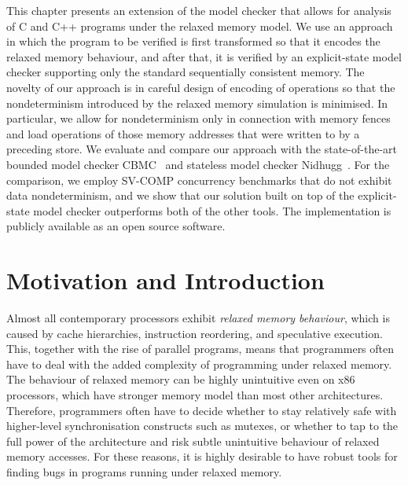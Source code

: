 
\bigskip\noindent
This chapter presents an extension of the \divine model checker that allows for
analysis of C and C++ programs under the \xtso relaxed memory model.
We use an approach in which the program to be verified is first transformed so
that it encodes the relaxed memory behaviour, and after that, it is
verified by an explicit-state model checker supporting only the standard
sequentially consistent memory.
The novelty of our approach is in careful design of encoding of \xtso
operations so that the nondeterminism introduced by the relaxed memory
simulation is minimised.
In particular, we allow for nondeterminism only in connection with memory
fences and load operations of those memory addresses that were written to by a
preceding store.
We evaluate and compare our approach with the state-of-the-art bounded model
checker CBMC~ and stateless model checker Nidhugg~.
For the comparison, we employ SV-COMP concurrency benchmarks that do not exhibit
data nondeterminism, and we show that our solution built on top of the
explicit-state model checker outperforms both of the other tools.
The implementation is publicly available as an open source software.

\section{Motivation and Introduction}

Almost all contemporary processors exhibit \emph{relaxed memory behaviour}, which is
caused by cache hierarchies, instruction reordering, and speculative execution.
This, together with the rise of parallel programs, means that programmers often have to deal with the added complexity of programming under relaxed memory.
The behaviour of relaxed memory can be highly unintuitive even on x86 processors, which have stronger memory model than most other architectures.
Therefore, programmers often have to decide whether to stay relatively safe with
higher-level synchronisation constructs such as mutexes, or whether to tap to the full power of the architecture and risk subtle unintuitive behaviour of relaxed memory accesses.
For these reasons, it is highly desirable to have robust tools for finding bugs in programs running under relaxed memory.

